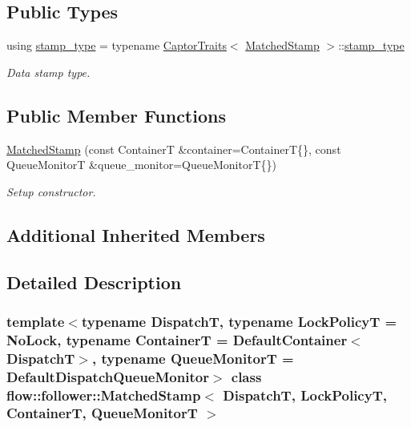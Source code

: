 \subsection*{Public Types}
\begin{DoxyCompactItemize}
\item 
\mbox{\label{classflow_1_1follower_1_1_matched_stamp_a46f9d99cd263a83d976d8f1bcb62bee0}} 
using \hyperlink{classflow_1_1follower_1_1_matched_stamp_a46f9d99cd263a83d976d8f1bcb62bee0}{stamp\+\_\+type} = typename \hyperlink{structflow_1_1_captor_traits}{Captor\+Traits}$<$ \hyperlink{classflow_1_1follower_1_1_matched_stamp}{Matched\+Stamp} $>$\+::\hyperlink{classflow_1_1follower_1_1_matched_stamp_a46f9d99cd263a83d976d8f1bcb62bee0}{stamp\+\_\+type}
\begin{DoxyCompactList}\small\item\em Data stamp type. \end{DoxyCompactList}\end{DoxyCompactItemize}
\subsection*{Public Member Functions}
\begin{DoxyCompactItemize}
\item 
\hyperlink{classflow_1_1follower_1_1_matched_stamp_a67f6b9b316170b553333d3c25dd47be0}{Matched\+Stamp} (const ContainerT \&container=ContainerT\{\}, const Queue\+MonitorT \&queue\+\_\+monitor=Queue\+MonitorT\{\})
\begin{DoxyCompactList}\small\item\em Setup constructor. \end{DoxyCompactList}\end{DoxyCompactItemize}
\subsection*{Additional Inherited Members}


\subsection{Detailed Description}
\subsubsection*{template$<$typename DispatchT, typename Lock\+PolicyT = No\+Lock, typename ContainerT = Default\+Container$<$\+Dispatch\+T$>$, typename Queue\+MonitorT = Default\+Dispatch\+Queue\+Monitor$>$\newline
class flow\+::follower\+::\+Matched\+Stamp$<$ Dispatch\+T, Lock\+Policy\+T, Container\+T, Queue\+Monitor\+T $>$}

